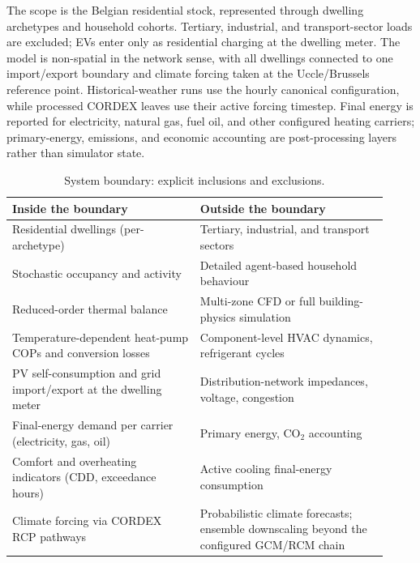 The scope is the Belgian residential stock, represented through dwelling archetypes and household cohorts. Tertiary, industrial, and transport-sector loads are excluded; EVs enter only as residential charging at the dwelling meter. The model is non-spatial in the network sense, with all dwellings connected to one import/export boundary and climate forcing taken at the Uccle/Brussels reference point. Historical-weather runs use the hourly canonical configuration, while processed CORDEX leaves use their active forcing timestep. Final energy is reported for electricity, natural gas, fuel oil, and other configured heating carriers; primary-energy, emissions, and economic accounting are post-processing layers rather than simulator state.

 
\begin{table}[ht]
  \centering
  \footnotesize
  \caption{System boundary: explicit inclusions and exclusions.}
  \label{tab:scope_inclusions_exclusions}
  \begin{tabular}{@{}p{0.46\linewidth} p{0.46\linewidth}@{}}
    \toprule
    \textbf{Inside the boundary} & \textbf{Outside the boundary} \\
    \midrule
    Residential dwellings (per-archetype) &
      Tertiary, industrial, and transport sectors \\
    Stochastic occupancy and activity &
      Detailed agent-based household behaviour \\
    Reduced-order thermal balance &
      Multi-zone CFD or full building-physics simulation \\
    Temperature-dependent heat-pump COPs and conversion losses &
      Component-level HVAC dynamics, refrigerant cycles \\
    PV self-consumption and grid import/export at the dwelling meter &
      Distribution-network impedances, voltage, congestion \\
    Final-energy demand per carrier (electricity, gas, oil) &
      Primary energy, $\mathrm{CO_2}$ accounting \\
    Comfort and overheating indicators (CDD, exceedance hours) &
      Active cooling final-energy consumption \\
    Climate forcing via CORDEX RCP pathways &
      Probabilistic climate forecasts; ensemble downscaling beyond
      the configured GCM/RCM chain \\
    \bottomrule
  \end{tabular}
\end{table}


